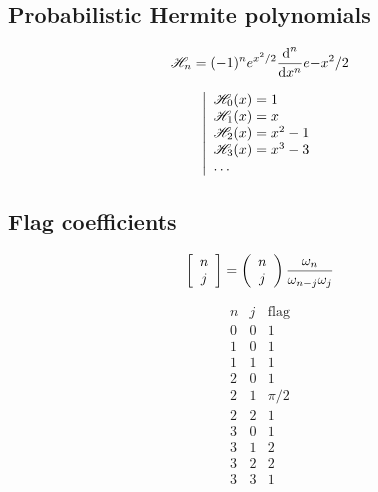 \documentclass[a4paper,12pt]{article}
\begin{document}
\subsection{Probabilistic Hermite polynomials}
\begin{minipage}{0.5\linewidth}
\begin{equation}\mathscr{H}_n=(-1)^n e^{x^2/2} \frac{\text{d}^n}{\text{d}x^n}e{-x^2/2}\end{equation}
\end{minipage}
\begin{minipage}{0.5\linewidth}
\begin{equation}
  \left|
  \begin{array}{l}
    \mathscr{H}_0(x)=1 \\
    \mathscr{H}_1(x)=x \\
    \mathscr{H}_2(x)=x^2-1 \\
    \mathscr{H}_3(x)=x^3-3 \\
    \dots
  \end{array}
  \right.
\end{equation}
\end{minipage}

\subsection{Flag coefficients}
\begin{minipage}{0.5\linewidth}
\begin{equation}
  \left[ \begin{array}{c} n \\ j \end{array} \right] = 
  \left( \begin{array}{c} n \\ j \end{array} \right)\frac{\omega_n}{\omega_{n-j}\omega_j}
\end{equation}
\end{minipage}
\begin{minipage}{0.5\linewidth}
\begin{equation}
  \begin{array}{c|c|c}
    n & j & \text{flag} \\
    \hline
    0 & 0 & 1\\
    1 & 0 & 1\\
    1 & 1 & 1\\
    2 & 0 & 1\\
    2 & 1 & \pi/2\\
    2 & 2 & 1\\
    3 & 0 & 1\\
    3 & 1 & 2\\
    3 & 2 & 2\\
    3 & 3 & 1
  \end{array}
\end{equation}
\end{minipage}
\end{document}
